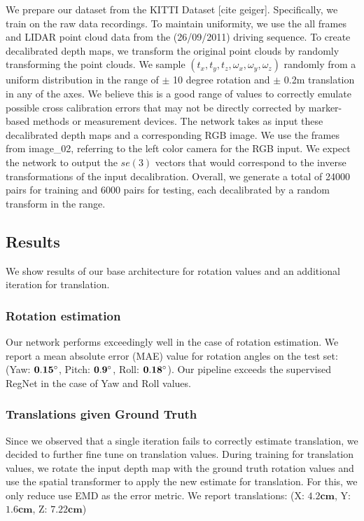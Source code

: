 \documentclass[letterpaper, 10 pt, conference]{ieeeconf}  %
\begin{document}
We prepare our dataset from the KITTI Dataset [cite geiger]. Specifically, we train on the raw data recordings. To maintain uniformity, we use the all frames and LIDAR point cloud data from the (26/09/2011) driving sequence. To create decalibrated depth maps, we transform the original point clouds by randomly transforming the point clouds. We sample $(t_x,t_y,t_z,\omega_x,\omega_y,\omega_z)$ randomly from a uniform distribution in the range of $\pm$ 10 degree rotation and $\pm$ 0.2m translation in any of the axes. We believe this is a good range of values to correctly emulate possible cross calibration errors that may not be directly corrected by marker-based methods or measurement devices. The network takes as input these decalibrated depth maps and a corresponding RGB image. We use the frames from image\_02, referring to the left color camera for the RGB input. We expect the network to output the $se(3)$ vectors that would correspond to the inverse transformations of the input decalibration. Overall, we generate a total of 24000 pairs for training and 6000 pairs for testing, each decalibrated by a random transform in the range.

\subsection{Results}

We show results of our base architecture for rotation values and an additional iteration for translation.

\subsubsection{Rotation estimation}

Our network performs exceedingly well in the case of rotation estimation. We report a mean absolute error (MAE) value for rotation angles on the test set: ({Yaw:} $\mathbf{0.15\degree}$, {Pitch:} $\mathbf{0.9\degree}$, {Roll:} $\mathbf{0.18\degree}$). Our pipeline exceeds the supervised RegNet in the case of Yaw and Roll values. 

\subsubsection{Translations given Ground Truth}

Since we observed that a single iteration fails to correctly estimate translation, we decided to further fine tune on translation values. During training for translation values, we rotate the input depth map with the ground truth rotation values and use the spatial transformer to apply the new estimate for translation. For this, we only reduce use EMD as the error metric. We report translations: ({X:} $\mathbf{4.2cm}$, {Y:} $\mathbf{1.6cm}$, {Z:} $\mathbf{7.22cm}$)
\end{document}
